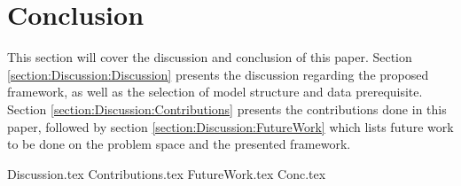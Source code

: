 \chapter{Conclusion}

\label{section:Discussion}

This section will cover the discussion and conclusion of this paper.
Section \ref{section:Discussion:Discussion} presents the discussion regarding the proposed framework,
as well as the selection of model structure and data prerequisite.
Section \ref{section:Discussion:Contributions} presents the contributions done in this paper,
followed by section \ref{section:Discussion:FutureWork} which lists future work to be done on the problem space and the presented framework.


{Discussion.tex}
{Contributions.tex}
{FutureWork.tex}
{Conc.tex}

